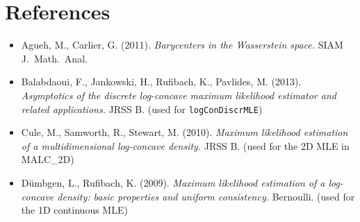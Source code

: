 \documentclass[11pt]{article}
\begin{document}
\section*{References}
\begin{itemize}
\item Agueh, M., Carlier, G. (2011). \emph{Barycenters in the Wasserstein space.} SIAM J.\ Math.\ Anal.
\item Balabdaoui, F., Jankowski, H., Rufibach, K., Pavlides, M. (2013). \emph{Asymptotics of the discrete log-concave maximum likelihood estimator and related applications.} JRSS B. (used for \texttt{logConDiscrMLE})
\item Cule, M., Samworth, R., Stewart, M. (2010). \emph{Maximum likelihood estimation of a multidimensional log-concave density.} JRSS B. (used for the 2D MLE in MALC\_2D)
\item D\"umbgen, L., Rufibach, K. (2009). \emph{Maximum likelihood estimation of a log-concave density: basic properties and uniform consistency.} Bernoulli. (used for the 1D continuous MLE)
\end{itemize}
\end{document}
